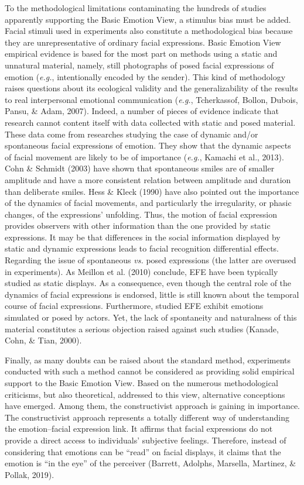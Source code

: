 \documentclass[man]{apa6}
\begin{document}
To the methodological limitations contaminating the hundreds of studies apparently supporting the Basic Emotion View, a stimulus bias must be added. Facial stimuli used in experiments also constitute a methodological bias because they are unrepresentative of ordinary facial expressions. Basic Emotion View empirical evidence is based for the most part on methods using a static and unnatural material, namely, still photographs of posed facial expressions of emotion (\emph{e.g.}, intentionally encoded by the sender). This kind of methodology raises questions about its ecological validity and the generalizability of the results to real interpersonal emotional communication (\emph{e.g.}, Tcherkassof, Bollon, Dubois, Pansu, \& Adam, 2007). Indeed, a number of pieces of evidence indicate that research cannot content itself with data collected with static and posed material. These data come from researches studying the case of dynamic and/or spontaneous facial expressions of emotion. They show that the dynamic aspects of facial movement are likely to be of importance (\emph{e.g.}, Kamachi et al., 2013). Cohn \& Schmidt (2003) have shown that spontaneous smiles are of smaller amplitude and have a more consistent relation between amplitude and duration than deliberate smiles. Hess \& Kleck (1990) have also pointed out the importance of the dynamics of facial movements, and particularly the irregularity, or phasic changes, of the expressions' unfolding. Thus, the motion of facial expression provides observers with other information than the one provided by static expressions. It may be that differences in the social information displayed by static and dynamic expressions leads to facial recognition differential effects. Regarding the issue of spontaneous \emph{vs.} posed expressions (the latter are overused in experiments). As Meillon et al. (2010) conclude, EFE have been typically studied as static displays. As a consequence, even though the central role of the dynamics of facial expressions is endorsed, little is still known about the temporal course of facial expressions. Furthermore, studied EFE exhibit emotions simulated or posed by actors. Yet, the lack of spontaneity and naturalness of this material constitutes a serious objection raised against such studies (Kanade, Cohn, \& Tian, 2000).

Finally, as many doubts can be raised about the standard method, experiments conducted with such a method cannot be considered as providing solid empirical support to the Basic Emotion View. Based on the numerous methodological criticisms, but also theoretical, addressed to this view, alternative conceptions have emerged. Among them, the constructivist approach is gaining in importance. The constructivist approach represents a totally different way of understanding the emotion--facial expression link. It affirms that facial expressions do not provide a direct access to individuals' subjective feelings. Therefore, instead of considering that emotions can be \enquote{read} on facial displays, it claims that the emotion is \enquote{in the eye} of the perceiver (Barrett, Adolphs, Marsella, Martinez, \& Pollak, 2019).
\end{document}
